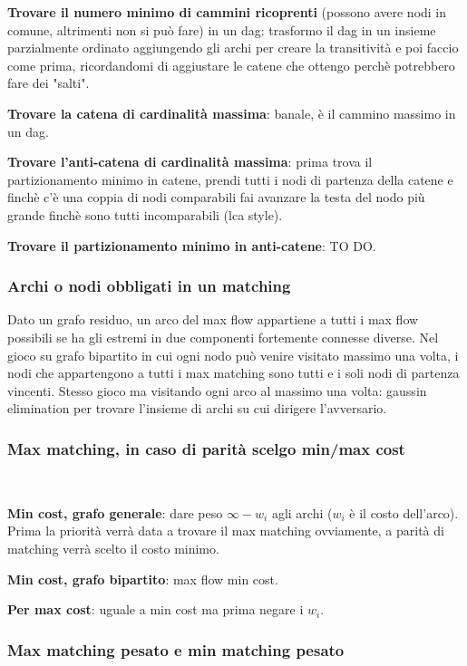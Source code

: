 \textbf{Trovare il numero minimo di cammini ricoprenti} (possono avere nodi in comune, altrimenti non si può fare) in un dag: trasformo il dag in un insieme parzialmente ordinato aggiungendo gli archi per creare la transitività e poi faccio come prima, ricordandomi di aggiustare le catene che ottengo perchè potrebbero fare dei "salti".

\textbf{Trovare la catena di cardinalità massima}: banale, è il cammino massimo in un dag. 

\textbf{Trovare l'anti-catena di cardinalità massima}: prima trova il partizionamento
minimo in catene, prendi tutti i nodi di partenza della catene e finchè c'è una coppia di nodi comparabili fai avanzare la testa del nodo più grande finchè sono tutti incomparabili (lca style).

\textbf{Trovare il partizionamento minimo in anti-catene}: TO DO. 

\subsubsection{Archi o nodi obbligati in un matching}
Dato un grafo residuo, un arco del max flow appartiene a tutti i max flow possibili se ha gli estremi in due componenti fortemente connesse diverse. Nel gioco su grafo bipartito in cui ogni nodo può venire visitato massimo una volta, i nodi che appartengono a tutti i max matching sono tutti e i soli nodi di partenza vincenti. Stesso gioco ma visitando ogni arco al massimo una volta: gaussin elimination per trovare l'insieme di archi su cui dirigere l'avversario.

\subsubsection{Max matching, in caso di parità scelgo min/max cost}
\,

\textbf{Min cost, grafo generale}: dare peso $\infty - w_i$ agli archi ($w_i$ è il costo dell'arco). Prima la priorità verrà data a trovare il max matching ovviamente, a parità di matching verrà scelto il costo minimo.

\textbf{Min cost, grafo bipartito}: max flow min cost.

\textbf{Per max cost}: uguale a min cost ma prima negare i $w_i$.

\subsubsection{Max matching pesato e min matching pesato}
\,

